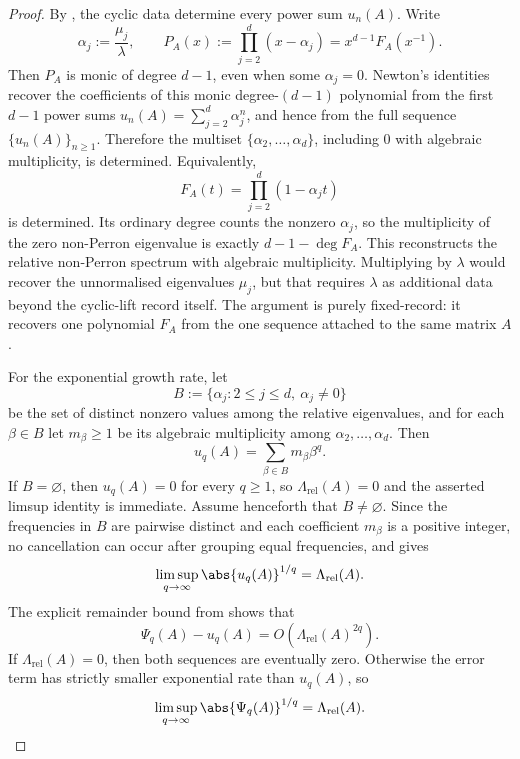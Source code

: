 \begin{proof}
  By , the cyclic
  data determine every power sum \(u_n(A)\). Write
  \[
    \alpha_j:=\frac{\mu_j}{\lambda},
    \qquad
    P_A(x):=\prod_{j=2}^d(x-\alpha_j)
    =x^{d-1}F_A(x^{-1}).
  \]
  Then \(P_A\) is monic of degree \(d-1\), even when some
  \(\alpha_j=0\). Newton's identities recover the coefficients of this
  monic degree-\((d-1)\) polynomial from the first \(d-1\) power sums
  \(u_n(A)=\sum_{j=2}^d\alpha_j^n\), and hence from the full sequence
  \(\{u_n(A)\}_{n\ge 1}\). Therefore the multiset
  \(\{\alpha_2,\dots,\alpha_d\}\), including \(0\) with algebraic
  multiplicity, is determined. Equivalently,
  \[
    F_A(t)=\prod_{j=2}^d(1-\alpha_j t)
  \]
  is determined. Its ordinary degree counts the nonzero \(\alpha_j\), so
  the multiplicity of the zero non-Perron eigenvalue is exactly
  \(d-1-\deg F_A\). This reconstructs the relative non-Perron spectrum
  with algebraic multiplicity. Multiplying by \(\lambda\) would recover
  the unnormalised eigenvalues \(\mu_j\), but that requires \(\lambda\)
  as additional data beyond the cyclic-lift record itself. The argument
  is purely fixed-record: it recovers one polynomial \(F_A\) from the
  one sequence attached to the same matrix \(A\).

  For the exponential growth rate, let
  \[
    B:=\{\alpha_j:2\le j\le d,\ \alpha_j\neq 0\}
  \]
  be the set of distinct nonzero values among the relative eigenvalues,
  and for each \(\beta\in B\) let \(m_\beta\ge 1\) be its algebraic
  multiplicity among \(\alpha_2,\dots,\alpha_d\). Then
  \[
    u_q(A)=\sum_{\beta\in B}m_\beta\beta^q.
  \]
  If \(B=\varnothing\), then \(u_q(A)=0\) for every \(q\ge 1\), so
  \(\Lambda_{\mathrm{rel}}(A)=0\) and the asserted limsup identity is
  immediate. Assume henceforth that \(B\neq\varnothing\). Since the
  frequencies in \(B\) are pairwise distinct and each coefficient
  \(m_\beta\) is a positive integer, no cancellation can occur after
  grouping equal frequencies, and
   gives
  \[
    \limsup_{q\to\infty}\abs{u_q(A)}^{1/q}
    =\Lambda_{\mathrm{rel}}(A).
  \]
  The explicit remainder bound from
   shows that
  \[
    \Psi_q(A)-u_q(A)
    =O\!\left(\Lambda_{\mathrm{rel}}(A)^{2q}\right).
  \]
  If \(\Lambda_{\mathrm{rel}}(A)=0\), then both sequences are
  eventually zero. Otherwise the error term has strictly smaller
  exponential rate than \(u_q(A)\), so
  \[
    \limsup_{q\to\infty}\abs{\Psi_q(A)}^{1/q}
    =\Lambda_{\mathrm{rel}}(A).
  \]
\end{proof}

